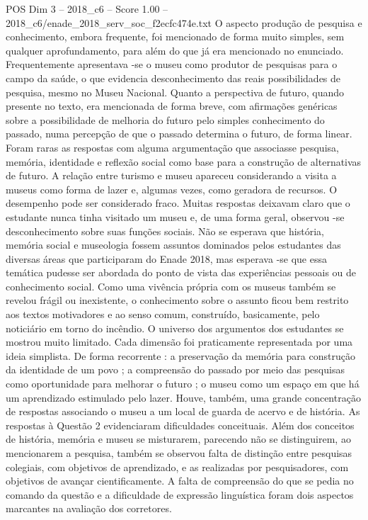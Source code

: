 \begin{textsample}{POS Dim 3 – 2018\_c6 – Score 1.00 – 2018\_c6/enade\_2018\_serv\_soc\_f2ecfc474e.txt}
O aspecto produção de pesquisa e conhecimento, embora frequente, foi mencionado de forma muito simples, sem qualquer aprofundamento, para além do que já era mencionado no enunciado.
Frequentemente apresentava -se o museu como produtor de pesquisas para o campo da saúde, o que evidencia desconhecimento das reais possibilidades de pesquisa, mesmo no Museu Nacional.
Quanto a perspectiva de futuro, quando presente no texto, era mencionada de forma breve, com afirmações genéricas sobre a possibilidade de melhoria do futuro pelo simples conhecimento do passado, numa percepção de que o passado determina o futuro, de forma linear.
Foram raras as respostas com alguma argumentação que associasse pesquisa, memória, identidade e reflexão social como base para a construção de alternativas de futuro.
A relação entre turismo e museu apareceu considerando a visita a museus como forma de lazer e, algumas vezes, como geradora de recursos.
O desempenho pode ser considerado fraco.
Muitas respostas deixavam claro que o estudante nunca tinha visitado um museu e, de uma forma geral, observou -se desconhecimento sobre suas funções sociais.
Não se esperava que história, memória social e museologia fossem assuntos dominados pelos estudantes das diversas áreas que participaram do Enade 2018, mas esperava -se que essa temática pudesse ser abordada do ponto de vista das experiências pessoais ou de conhecimento social.
Como uma vivência própria com os museus também se revelou frágil ou inexistente, o conhecimento sobre o assunto ficou bem restrito aos textos motivadores e ao senso comum, construído, basicamente, pelo noticiário em torno do incêndio.
O universo dos argumentos dos estudantes se mostrou muito limitado.
Cada dimensão foi praticamente representada por uma ideia simplista.
De forma recorrente : a preservação da memória para construção da identidade de um povo ; a compreensão do passado por meio das pesquisas como oportunidade para melhorar o futuro ; o museu como um espaço em que há um aprendizado estimulado pelo lazer.
Houve, também, uma grande concentração de respostas associando o museu a um local de guarda de acervo e de história.
As respostas à Questão 2 evidenciaram dificuldades conceituais.
Além dos conceitos de história, memória e museu se misturarem, parecendo não se distinguirem, ao mencionarem a pesquisa, também se observou falta de distinção entre pesquisas colegiais, com objetivos de aprendizado, e as realizadas por pesquisadores, com objetivos de avançar cientificamente.
A falta de compreensão do que se pedia no comando da questão e a dificuldade de expressão linguística foram dois aspectos marcantes na avaliação dos corretores.

\end{textsample}
